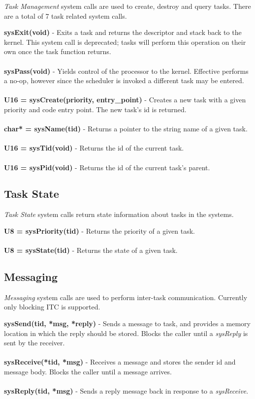 \documentclass[twoside,a4paper]{refart}
\begin{document}
\textit{Task Management} system calls are used to create, destroy and query tasks. There are a total of 7 task related system calls.

\textbf{sysExit(void)} - Exits a task and returns the descriptor and stack back to the kernel. This system call is deprecated; tasks will perform this operation on their own once the task function returns.\\\\
\textbf{sysPass(void)} - Yields control of the processor to the kernel. Effective performs a no-op, however since the scheduler is invoked a different task may be entered.\\\\
\textbf{U16 = sysCreate(priority, entry\_point)} - Creates a new task with a given priority and code entry point. The new task's id is returned.\\\\
\textbf{char* = sysName(tid)} - Returns a pointer to the string name of a given task.\\\\
\textbf{U16 = sysTid(void)} - Returns the id of the current task.\\\\
\textbf{U16 = sysPid(void)} - Returns the id of the current task's parent.

\subsection{Task State}

\textit{Task State} system calls return state information about tasks in the systems.

\textbf{U8 = sysPriority(tid)} - Returns the priority of a given task.\\\\
\textbf{U8 = sysState(tid)} - Returns the state of a given task.

\subsection{Messaging}

\textit{Messaging} system calls are used to perform inter-task communication. Currently only blocking ITC is supported.

\textbf{sysSend(tid, *msg, *reply)} - Sends a message to task, and provides a memory location in which the reply should be stored. Blocks the caller until a \textit{sysReply} is sent by the receiver.\\\\
\textbf{sysReceive(*tid, *msg)} - Receives a message and stores the sender id and message body. Blocks the caller until a message arrives.\\\\
\textbf{sysReply(tid, *msg)} - Sends a reply message back in response to a \textit{sysReceive}.
\end{document}
